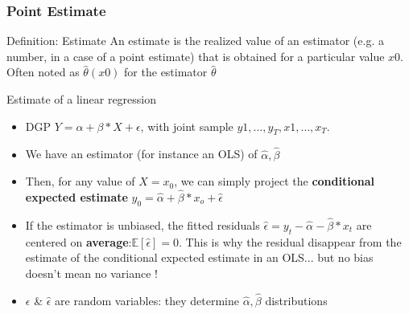 \documentclass{beamer}
\begin{document}
  \begin{frame}
    \frametitle{Point Estimate}
    \begin{block}{Definition: Estimate}
      An estimate is the realized value of an estimator (e.g. a number, in a case of a point estimate) that is obtained for a particular value $x0$. Often noted as $\hat{\theta}(x0)$ for the estimator $\hat{\theta}$
    \end{block}

    \begin{exampleblock}{Estimate of a linear regression}
      \begin{itemize}
      \item DGP $Y = \alpha + \beta*X + \epsilon$, with joint sample ${y1, \dots, y_T}, {x1, \dots, x_T}$.\\
      \item We have an estimator (for instance an OLS) of $\hat{\alpha}, \hat{\beta}$
      \item Then, for any value of $X=x_0$, we can simply project the \textbf{conditional expected estimate} $y_0 = \hat{\alpha} + \hat{\beta}*x_o + \hat{\epsilon}$
      \item If the estimator is unbiased, the fitted residuals $\hat{\epsilon} = y_t - \hat{\alpha} - \hat{\beta}*x_t$ are centered on \textbf{average}:$\mathbb{E}\left[\hat{\epsilon}\right]=0$. This is why the residual disappear from the estimate of the conditional expected estimate in an OLS... but no bias doesn't mean no variance !
      \item $\epsilon$ \& $\hat{\epsilon}$ are random variables: they determine $\hat{\alpha}, \hat{\beta}$ distributions
      \end{itemize}
    \end{exampleblock}    
  \end{frame}
\end{document}
